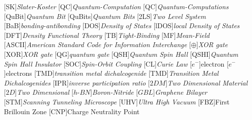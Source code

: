 \begin{acronym}[TDMA]
  [SK]{\emph{Slater-Koster}}
  [QC]{\emph{Quantum-Computation}}
  [QC]{\emph{Quantum-Computations}}
  [QuBit]{\emph{Quantum Bit}}
  [QuBits]{\emph{Quantum Bits}}
  [2LS]{\emph{Two Level System}}
  [BaB]{\emph{bonding-antibonding}}
  [DOS]{\emph{Density of States}}
  [lDOS]{\emph{local Density of States}}
  [DFT]{\emph{Density Functional Theory}}
  [TB]{\emph{Tight-Binding}}
  [MF]{\emph{Mean-Field}}
  [ASCII]{\emph{American Standard Code for Information Interchange}}
  [$\oplus$]{\emph{XOR gate}}
  [XOR]{\emph{XOR gate}}
  [QG]{\emph{quantum gate}}
  [QSH]{\emph{Quantum Spin Hall}}
  [QSHI]{\emph{Quantum Spin Hall Insulator}}
  [SOC]{\emph{Spin-Orbit Coupling}}
  [CL]{\emph{Curie Law}}
  [$e^{-}$]{electron}
  [$e^{-}$]{electrons}
  [TMD]{\emph{transition metal dichalcogenide}}
  [TMD]{\emph{Transition Metal Dichalcogenides}}
  [IPR]{\emph{inverse participation ratio}}
  [$2DM$]{\emph{Two Dimensional Material}}
  [$2D$]{\emph{Two Dimensional}}
  [$h$-$BN$]{\emph{Boron-Nitride}}
  [$GBL$]{\emph{Graphene Bilayer}}
  [STM]{\emph{Scanning Tunneling Microscope}}
  [UHV]{\emph{Ultra High Vacuum}}
  [FBZ]{First Brillouin Zone}
  [CNP]{Charge Neutrality Point}
\end{acronym}
